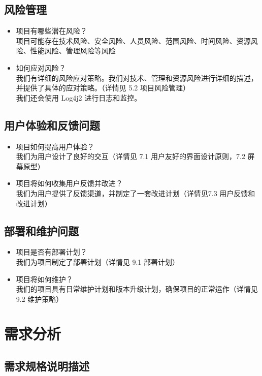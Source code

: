 \documentclass{article}
\begin{document}
\subsection{风险管理}
\begin{itemize}
	\item 项目有哪些潜在风险？\\
	项目可能存在技术风险、安全风险、人员风险、范围风险、时间风险、资源风险、性能风险、管理风险等风险
	\item 如何应对风险？\\
	我们有详细的风险应对策略。我们对技术、管理和资源风险进行详细的描述，并提供了具体的应对策略。（详情见 5.2 项目风险管理）\\
	我们还会使用 Log4j2 进行日志和监控。
\end{itemize}

\subsection{用户体验和反馈问题}
\begin{itemize}
	\item 项目如何提高用户体验？\\
	我们为用户设计了良好的交互（详情见 7.1 用户友好的界面设计原则，7.2 屏幕原型）
	\item 项目将如何收集用户反馈并改进？\\
	我们为用户提供了反馈渠道，并制定了一套改进计划（详情见7.3 用户反馈和改进计划）
\end{itemize}

\subsection{部署和维护问题}
\begin{itemize}
	\item 项目是否有部署计划？\\
	我们为项目制定了部署计划（详情见 9.1 部署计划）
	\item 项目将如何维护？\\
	我们的项目具有日常维护计划和版本升级计划，确保项目的正常运作（详情见 9.2 维护策略）
\end{itemize}

\section{需求分析}
\subsection{需求规格说明描述}
\end{document}
